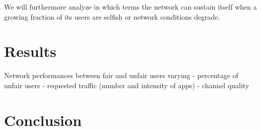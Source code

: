 \documentclass[conference]{IEEEtran}
\begin{document}
We will furthermore analyze in which terms the network can sustain itself when a
growing fraction of its users are selfish or network conditions degrade.


\section{Results} \label{sec:results}

Network performances between fair and unfair users varying
- percentage of unfair users
- requested traffic (number and intensity of apps)
- channel quality

\section{Conclusion}


% 
\end{document}
